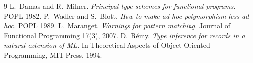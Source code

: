 \begin{thebibliography}{9}
 L.~Damas and R.~Milner.
  \emph{Principal type-schemes for functional programs.} POPL 1982.
 P.~Wadler and S.~Blott.
  \emph{How to make ad-hoc polymorphism less ad hoc.} POPL 1989.
 L.~Maranget.
  \emph{Warnings for pattern matching.} Journal of Functional Programming 17(3), 2007.
 D.~R\'emy.
  \emph{Type inference for records in a natural extension of ML.} In
  Theoretical Aspects of Object-Oriented Programming, MIT Press, 1994.
\end{thebibliography}
